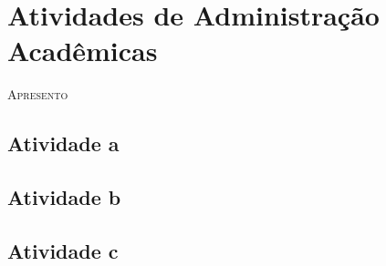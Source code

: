 \chapter{Atividades de Administração Acadêmicas}

%

\lettrine[lines=2, lhang=0.33, loversize=0.25, findent=1.5em]{A}{presento} 
\lipsum[50]


\section{Atividade a}
\lipsum[49]

\lipsum[50]

\lipsum[51]

\section{Atividade b}
\lipsum[52]

\lipsum[53]

\lipsum[54]

\section{Atividade c}

\lipsum[55]

\lipsum[56]

\lipsum[57]
